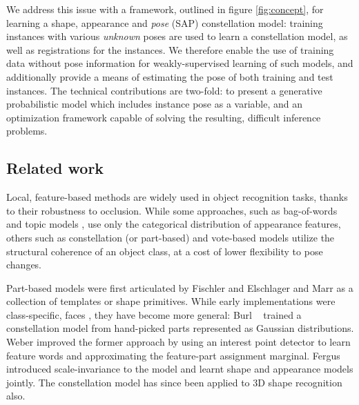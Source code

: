 We address this issue with a framework, outlined in figure \ref{fig:concept}, for learning a shape, appearance and \emph{pose} (SAP) constellation model: training instances with various \emph{unknown} poses are used to learn a constellation model, as well as registrations for the instances. We therefore enable the use of training data without pose information for weakly-supervised learning of such models, and additionally provide a means of estimating the pose of both training and test instances. The technical contributions are two-fold: to present a generative probabilistic model which includes instance pose as a variable, and an optimization framework capable of solving the resulting, difficult inference problems.


\subsection{Related work}
\label{sec:relatedwork}

Local, feature-based methods are widely used in object recognition tasks, thanks to their robustness to occlusion. While some approaches, such as bag-of-words \cite{Sivic2005, Fei-Fei2005} and topic models \cite{Fergus2005}, use only the categorical distribution of appearance features, others such as constellation (or part-based) and vote-based models utilize the structural coherence of an object class, at a cost of lower flexibility to pose changes.

Part-based models were first articulated by Fischler and Elschlager \cite{Fischler1973} and Marr \cite{Marr1982} as a collection of templates or shape primitives. While early implementations were class-specific, \eg faces \cite{Yuille1989}, they have become more general: Burl \etal~\cite{Burl1998} trained a constellation model from hand-picked parts represented as Gaussian distributions. Weber \etal \cite{Weber2000} improved the former approach by using an interest point detector \cite{Kadir2001} to learn feature words and approximating the feature-part assignment marginal. Fergus \etal \cite{Fergus2007} introduced scale-invariance to the model and learnt shape and appearance models jointly. 
The constellation model has since been applied to 3D shape recognition~\cite{MuktaPrasad2011} also.

